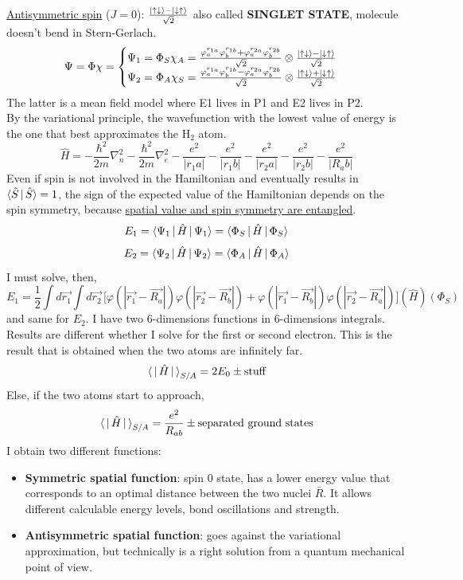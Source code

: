 \newline
\underline{Antisymmetric spin} ($J=0$): $\frac{\ket{\uparrow\downarrow}-\ket{\downarrow\uparrow}}{\sqrt{2}}$ also called \textbf{SINGLET STATE}, molecule doesn't bend in Stern-Gerlach.\\
\[
\Psi=\Phi\chi=\begin{cases}
\Psi_1=\Phi_S\chi_A=\frac{\varphi_a^{r_{1a}}\varphi_b^{r_{1b}}+\varphi_a^{r_{2a}}\varphi_b^{r_{2b}}}{\sqrt{2}}\otimes\frac{\ket{\uparrow\downarrow}-\ket{\downarrow\uparrow}}{\sqrt{2}}\\
\Psi_2=\Phi_A\chi_S=\frac{\varphi_a^{r_{1a}}\varphi_b^{r_{1b}}-\varphi_a^{r_{2a}}\varphi_b^{r_{2b}}}{\sqrt{2}}\otimes\frac{\ket{\uparrow\downarrow}+\ket{\downarrow\uparrow}}{\sqrt{2}}\\
\end{cases}
\]
The latter is a mean field model where E1 lives in P1 and E2 lives in P2.\\
By the variational principle, the wavefunction with the lowest value of energy is the one that best approximates the H$_2$ atom.\\
\[
\hat{H}=-\frac{\hbar^2}{2m}\nabla_n^2-\frac{\hbar^2}{2m}\nabla_e^2-\frac{e^2}{|r_1a|}-\frac{e^2}{|r_1b|}-\frac{e^2}{|r_2a|}-\frac{e^2}{|r_2b|}-\frac{e^2}{|R_ab|}
\]
Even if spin is not involved in the Hamiltonian and eventually results in $\braket{\hat{S}\,|\,\hat{S}}=1$, the sign of the expected value of the Hamiltonian depends on the spin symmetry, because \underline{spatial value and spin symmetry are entangled}.
\[E_1=\braket{\Psi_1\,|\,\hat{H}\,|\,\Psi_1}=\braket{\Phi_S\,|\,\hat{H}\,|\,\Phi_S}\]
\[E_2=\braket{\Psi_2\,|\,\hat{H}\,|\,\Psi_2}=\braket{\Phi_A\,|\,\hat{H}\,|\,\Phi_A}\]
I must solve, then,
\[
E_1=\frac{1}{2}\int d\vec{r_1}\int d\vec{r_2}\,\big[\varphi(|\vec{r_1}-\vec{R_a}|)\varphi(|\vec{r_2}-\vec{R_b}|)+\varphi(|\vec{r_1}-\vec{R_b}|)\varphi(|\vec{r_2}-\vec{R_a}|)\big](\hat{H})(\Phi_S)
\]
and same for $E_2$. I have two 6-dimensions functions in 6-dimensions integrals.\\
Results are different whether I solve for the first or second electron. This is the result that is obtained when the two atoms are infinitely far.\\
\[
\braket{\,|\,\hat{H}\,|\,}_{S/A}=2E_0\pm\text{stuff}
\]
Else, if the two atoms start to approach,
\[
\braket{\,|\,\hat{H}\,|\,}_{S/A}=\frac{e^2}{R_{ab}}\pm\text{separated ground states}
\]
I obtain two different functions:
\begin{itemize}
	\item \textbf{Symmetric spatial function}: spin 0 state, has a lower energy value that corresponds to an optimal distance between the two nuclei $\bar{R}$. It allows different calculable energy levels, bond oscillations and strength.
	\item \textbf{Antisymmetric spatial function}: goes against the variational approximation, but technically is a right solution from a quantum mechanical point of view.
\end{itemize}

